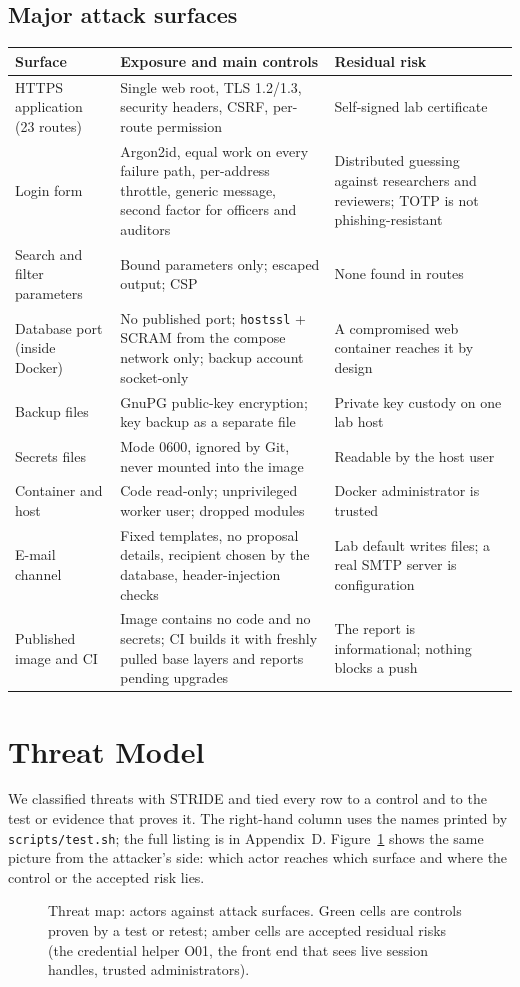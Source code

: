 \documentclass[10pt,a4paper]{article}
\newcommand{\code}[1]{\nolinkurl{#1}}
\newcommand{\diagram}[3]{\begin{figure}[!htbp]\centering\adjustbox{max width=\linewidth,max height=6.6cm}{}\caption{#2}\label{fig:#3}\end{figure}}
\newcommand{\tcap}[1]{\captionof{table}{#1}\nopagebreak[4]\vspace{-3pt}}
\begin{document}
\subsection{Major attack surfaces}
\tcap{Major attack surfaces}
\begin{center}\small
\begin{tabularx}{\linewidth}{@{}L{3.6cm}YL{3.3cm}@{}}
\toprule\textbf{Surface} & \textbf{Exposure and main controls} & \textbf{Residual risk}\\\midrule
HTTPS application (23 routes) & Single web root, TLS 1.2/1.3, security headers, CSRF, per-route permission & Self-signed lab certificate\\
Login form & Argon2id, equal work on every failure path, per-address throttle, generic message, second factor for officers and auditors & Distributed guessing against researchers and reviewers; TOTP is not phishing-resistant\\
Search and filter parameters & Bound parameters only; escaped output; CSP & None found in routes\\
Database port (inside Docker) & No published port; \code{hostssl} + SCRAM from the compose network only; backup account socket-only & A compromised web container reaches it by design\\
Backup files & GnuPG public-key encryption; key backup as a separate file & Private key custody on one lab host\\
Secrets files & Mode 0600, ignored by Git, never mounted into the image & Readable by the host user\\
Container and host & Code read-only; unprivileged worker user; dropped modules & Docker administrator is trusted\\
E-mail channel & Fixed templates, no proposal details, recipient chosen by the database, header-injection checks & Lab default writes files; a real SMTP server is configuration\\
Published image and CI & Image contains no code and no secrets; CI builds it with freshly pulled base layers and reports pending upgrades & The report is informational; nothing blocks a push\\
\bottomrule\end{tabularx}\end{center}

\section{Threat Model}\label{sec:threat}
We classified threats with STRIDE and tied every row to a control and to the test or evidence that proves it. The right-hand column uses the names printed by \code{scripts/test.sh}; the full listing is in Appendix~D. Figure~\ref{fig:threatmap} shows the same picture from the attacker's side: which actor reaches which surface and where the control or the accepted risk lies.
\diagram{threatmap}{Threat map: actors against attack surfaces. Green cells are controls proven by a test or retest; amber cells are accepted residual risks (the credential helper O01, the front end that sees live session handles, trusted administrators).}{threatmap}
\end{document}
